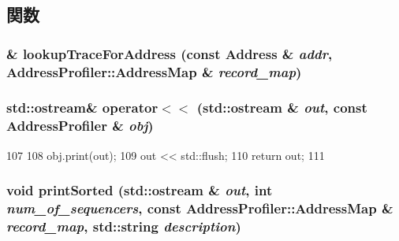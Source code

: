 \subsection{関数}
\hypertarget{AddressProfiler_8hh_a4e6cbe0e614b5baaeb362e356a386ce5}{
\subsubsection[{lookupTraceForAddress}]{\& lookupTraceForAddress (const {\bf Address} \& {\em addr}, \/  {\bf AddressProfiler::AddressMap} \& {\em record\_\-map})}}
\label{AddressProfiler_8hh_a4e6cbe0e614b5baaeb362e356a386ce5}
\hypertarget{AddressProfiler_8hh_a903d5ae9799120d03239d7a6496bbdf7}{
\subsubsection[{operator$<$$<$}]{\setlength{\rightskip}{0pt plus 5cm}std::ostream\& operator$<$$<$ (std::ostream \& {\em out}, \/  const {\bf AddressProfiler} \& {\em obj})}}
\label{AddressProfiler_8hh_a903d5ae9799120d03239d7a6496bbdf7}



\begin{DoxyCode}
107 {
108     obj.print(out);
109     out << std::flush;
110     return out;
111 }
\end{DoxyCode}
\hypertarget{AddressProfiler_8hh_ae2245db015c072683d3fd3ddce063bac}{
\subsubsection[{printSorted}]{\setlength{\rightskip}{0pt plus 5cm}void printSorted (std::ostream \& {\em out}, \/  int {\em num\_\-of\_\-sequencers}, \/  const {\bf AddressProfiler::AddressMap} \& {\em record\_\-map}, \/  std::string {\em description})}}
\label{AddressProfiler_8hh_ae2245db015c072683d3fd3ddce063bac}
